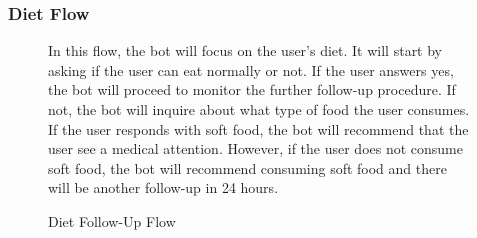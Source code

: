 \documentclass[12pt,oneside,openright,a4paper]{cpe-english-project}
\begin{document}
        \subsubsection{Diet  Flow}
          \begin{figure}[H]
            \centering
            \caption{Diet Follow-Up Flow}\label{fig:FollowUpFlow5}
            \begin{justify}
              \qquad In this flow, the bot will focus on the user's diet. It will start by asking if the user can eat normally or not. If the user answers yes,  the bot will proceed to monitor the further follow-up procedure. If not, the bot will inquire about what type of food the user consumes. If the user responds with soft food, the bot will recommend that the user see a medical attention. However, if the user does not consume soft food, the bot will recommend consuming soft food and there will be another follow-up in 24 hours.\par
            \end{justify}        
          \end{figure}
\end{document}
